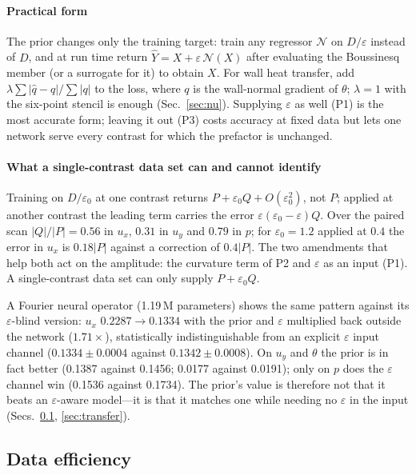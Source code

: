 \documentclass[preprint,11pt,a4paper,times,doubleblind]{elsarticle}
\begin{document}
\paragraph{Practical form} The prior changes only the training target: train any regressor
$\mathcal{N}$ on $D/\varepsilon$ instead of $D$, and at run time return
$\hat Y=X+\varepsilon\,\mathcal{N}(X)$ after evaluating the Boussinesq member (or a surrogate for
it) to obtain $X$. For wall heat transfer, add $\lambda\sum|\hat q-q|/\sum|q|$ to the loss, where
$q$ is the wall-normal gradient of $\theta$; $\lambda=1$ with the six-point stencil is enough
(Sec.~\ref{sec:nu}). Supplying $\varepsilon$ as well (P1) is the most accurate form; leaving it out
(P3) costs accuracy at fixed data but lets one network serve every contrast for which the prefactor
is unchanged.

\paragraph{What a single-contrast data set can and cannot identify} Training on $D/\varepsilon_0$
at one contrast returns $P+\varepsilon_0Q+O(\varepsilon_0^2)$, not $P$; applied at another
contrast the leading term carries the error $\varepsilon(\varepsilon_0-\varepsilon)Q$. Over the
paired scan $|Q|/|P|=0.56$ in $u_x$, $0.31$ in $u_y$ and $0.79$ in $p$; for $\varepsilon_0=1.2$
applied at $0.4$ the error in $u_x$ is $0.18|P|$ against a correction of $0.4|P|$. The two
amendments that help both act on the amplitude: the curvature term of P2 and $\varepsilon$ as an
input (P1). A single-contrast data set can only supply $P+\varepsilon_0Q$.

A Fourier neural operator (1.19\,M parameters) shows the same pattern against its
$\varepsilon$-blind version: $u_x$ $0.2287\to0.1334$ with the prior and $\varepsilon$
multiplied back outside the network ($1.71\times$), statistically indistinguishable from an
explicit $\varepsilon$ input channel ($0.1334\pm0.0004$ against $0.1342\pm0.0008$). On $u_y$ and
$\theta$ the prior is in fact better (0.1387 against 0.1456; 0.0177 against 0.0191); only on $p$
does the $\varepsilon$ channel win (0.1536 against 0.1734). The prior's value is therefore not that
it beats an $\varepsilon$-aware model---it is that it matches one while needing no $\varepsilon$ in
the input (Secs.~\ref{sec:learning}, \ref{sec:transfer}).

\subsection{Data efficiency}
\label{sec:learning}
\end{document}
